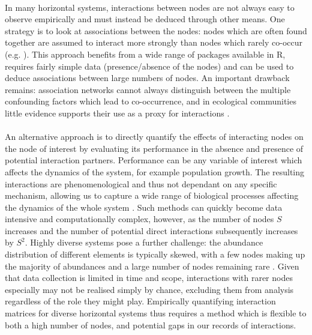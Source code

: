 \documentclass[a4,12pt]{article}
\begin{document}
    \paragraph{} 
    In many horizontal systems, interactions between nodes are not always easy to observe empirically and must instead be deduced through other means. One strategy is to look at associations between the nodes: nodes which are often found together are assumed to interact more strongly than nodes which rarely co-occur (e.g. \cite{Araujo2011}). This approach benefits from a wide range of packages available in R, requires fairly simple data (presence/absence of the nodes) and can be used to deduce associations between large numbers of nodes. An important drawback remains: association networks cannot always distinguish between the multiple confounding factors which lead to co-occurrence, and in ecological communities little evidence supports their use as a proxy for interactions \parencite{Sander2017,Barner2018, Thurman2019, Blanchet2020}.

    \paragraph{}
    An alternative approach is to directly quantify the effects of interacting nodes on the node of interest by evaluating its performance in the absence and presence of potential interaction partners. Performance can be any variable of interest which affects the dynamics of the system, for example population growth. The resulting interactions are phenomenological and thus not dependant on any specific mechanism, allowing us to capture a wide range of biological processes affecting the dynamics of the whole system \parencite{Novak2010}. Such methods can quickly become data intensive and computationally complex, however, as the number of nodes $S$ increases and the number of potential direct interactions subsequently increases by $S^2$. Highly diverse systems pose a further challenge: the abundance distribution of different elements is typically skewed, with a few nodes making up the majority of abundances and a large number of nodes remaining rare \parencite{Fisher1943}. Given that data collection is limited in time and scope, interactions with rarer nodes especially may not be realised simply by chance, excluding them from analysis regardless of the role they might play. Empirically quantifying interaction matrices for diverse horizontal systems thus requires a method which is flexible to both a high number of nodes, and potential gaps in our records of interactions. 
\end{document}
